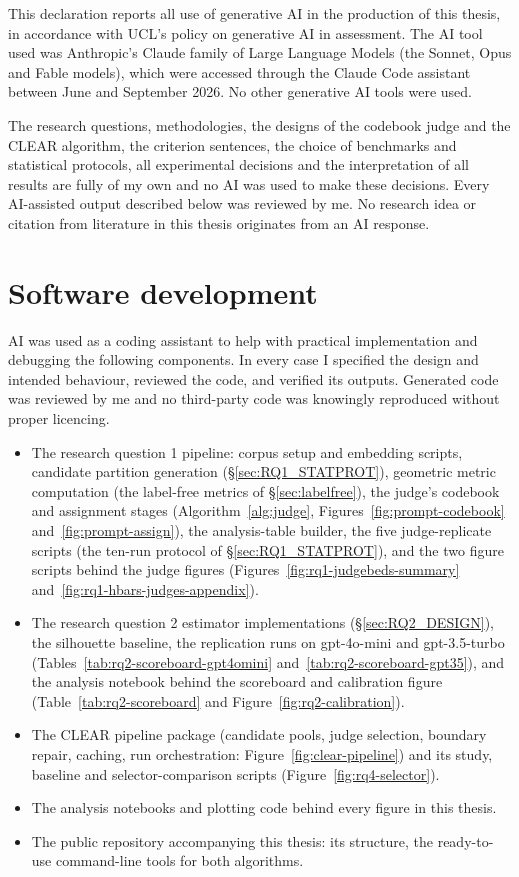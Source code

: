 \documentclass[11pt,a4paper,oneside]{report}
\begin{document}
This declaration reports all use of generative AI in the production of this
thesis, in accordance with UCL's policy on generative AI in assessment. The AI tool used was Anthropic's Claude family of
Large Language Models (the Sonnet, Opus and Fable models), which were accessed through
the Claude Code assistant between June and September 2026. No other generative
AI tools were used.

The research questions, methodologies, the designs of the codebook judge and the CLEAR
algorithm, the criterion sentences, the choice of benchmarks and statistical
protocols, all experimental decisions and the interpretation of all results
are fully of my own and no AI was used to make these decisions. Every AI-assisted output described below was reviewed by me. No
research idea or citation from literature in this thesis originates from an AI response.

\section*{Software development}

AI was used as a coding assistant to help with practical implementation and debugging the
following components. In every case I specified the design and intended
behaviour, reviewed the code, and verified its outputs. Generated code was
reviewed by me and no third-party code was knowingly reproduced without proper 
licencing.

\begin{itemize}
\item The research question 1 pipeline: corpus setup and embedding scripts,
candidate partition generation (\S\ref{sec:RQ1_STATPROT}), geometric metric computation
(the label-free metrics of \S\ref{sec:labelfree}), the judge's
codebook and assignment stages (Algorithm~\ref{alg:judge}, Figures~\ref{fig:prompt-codebook}
and~\ref{fig:prompt-assign}), the analysis-table builder, the five
judge-replicate scripts (the ten-run protocol of \S\ref{sec:RQ1_STATPROT}), and the two
figure scripts behind the judge figures (Figures~\ref{fig:rq1-judgebeds-summary}
and~\ref{fig:rq1-hbars-judges-appendix}).
\item The research question 2 estimator implementations (\S\ref{sec:RQ2_DESIGN}), the silhouette
baseline, the replication runs on {\small\ttfamily gpt-4o-mini} and
{\small\ttfamily gpt-3.5-turbo} (Tables~\ref{tab:rq2-scoreboard-gpt4omini}
and~\ref{tab:rq2-scoreboard-gpt35}), and the analysis notebook behind the
scoreboard and calibration figure (Table~\ref{tab:rq2-scoreboard} and
Figure~\ref{fig:rq2-calibration}).
\item The CLEAR pipeline package (candidate pools, judge selection, boundary
repair, caching, run orchestration: Figure~\ref{fig:clear-pipeline}) and its study, baseline and
selector-comparison scripts (Figure~\ref{fig:rq4-selector}).
\item The analysis notebooks and plotting code behind every figure in this
thesis.
\item The public repository accompanying this thesis: its structure, the
ready-to-use command-line tools for both algorithms.
\end{itemize}
\end{document}
